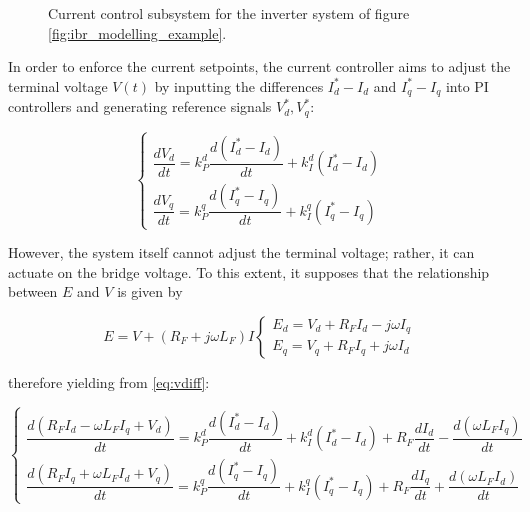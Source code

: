 \begin{example}
\begin{figure}
{
}
\caption{Current control subsystem for the inverter system of figure \ref{fig:ibr_modelling_example}.}
\label{fig:3p_curr_control}
\end{figure}

	In order to enforce the current setpoints, the current controller aims to adjust the terminal voltage $V(t)$ by inputting the differences $I_d^* - I_d$ and $I_q^* - I_q$ into PI controllers and generating reference signals $V_d^*,V_q^*$:

\begin{equation} \left\{\begin{array}{l}
\dfrac{d V_d }{dt} = k_P^d\dfrac{d\left(I_d^* - I_d\right)}{dt} + k_I^d\left(I_d^* - I_d\right) \\[5mm]
%
\dfrac{d V_q}{dt} = k_P^q\dfrac{d\left(I_q^* - I_q\right)}{dt} + k_I^q\left(I_q^* - I_q\right) 
\end{array}\right. \label{eq:vdiff}
\end{equation}

	However, the system itself cannot adjust the terminal voltage; rather, it can actuate on the bridge voltage. To this extent, it supposes that the relationship between $E$ and $V$ is given by

\begin{equation} E = V + \left(R_F + j\omega L_F\right)I \left\{\begin{array}{l} E_d = V_d + R_FI_d - j\omega I_q \\[3mm] E_q = V_q + R_FI_q + j\omega I_d \end{array}\right. \label{eq:example_quasistatic_supposition}\end{equation}

	\noindent therefore yielding from \eqref{eq:vdiff}:

\begin{equation} \left\{\begin{array}{l}
\dfrac{d\left(R_FI_d - \omega L_FI_q + V_d\right)}{dt} = k_P^d\dfrac{d\left(I_d^* - I_d\right)}{dt} + k_I^d\left(I_d^* - I_d\right) + R_F\dfrac{dI_d}{dt} - \dfrac{d\left(\omega L_F I_q\right)}{dt} \\[5mm]
%
\dfrac{d\left(R_FI_q + \omega L_FI_d + V_q\right)}{dt} = k_P^q\dfrac{d\left(I_q^* - I_q\right)}{dt} + k_I^q\left(I_q^* - I_q\right) + R_F\dfrac{dI_q}{dt} + \dfrac{d\left(\omega L_F I_d\right)}{dt} 
\end{array}\right. \label{eq:evdiff}
\end{equation}


\end{example}
